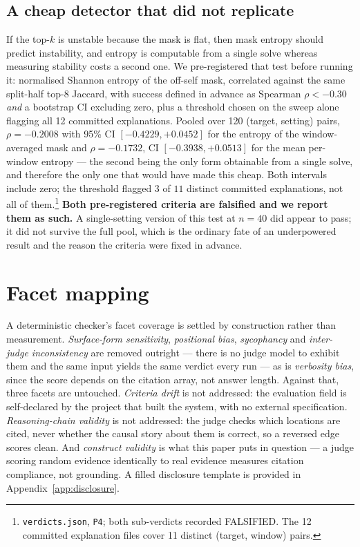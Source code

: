 \documentclass{article}
\begin{document}
\subsection{A cheap detector that did not replicate}

If the top-$k$ is unstable because the mask is flat, then mask entropy should
predict instability, and entropy is computable from a single solve whereas measuring
stability costs a second one. We pre-registered that test before running it:
normalised Shannon entropy of the off-self mask, correlated against the same
split-half top-8 Jaccard, with success defined in advance as Spearman
$\rho < -0.30$ \emph{and} a bootstrap CI excluding zero, plus a threshold chosen on
the sweep alone flagging all 12 committed explanations. Pooled over 120
(target, setting) pairs, $\rho = -0.2008$ with 95\% CI $[-0.4229, +0.0452]$ for the
entropy of the window-averaged mask and $\rho = -0.1732$, CI $[-0.3938, +0.0513]$
for the mean per-window entropy --- the second being the only form obtainable from a
single solve, and therefore the only one that would have made this cheap. Both
intervals include zero; the threshold flagged $3$ of $11$ distinct committed
explanations, not all of
them.\footnote{\texttt{verdicts.json}, \texttt{P4}; both sub-verdicts recorded
FALSIFIED. The 12 committed explanation files cover 11 distinct (target, window)
pairs.} \textbf{Both pre-registered criteria are falsified and we report them as
such.} A single-setting version of this test at $n{=}40$ did appear to pass; it did
not survive the full pool, which is the ordinary fate of an underpowered result and
the reason the criteria were fixed in advance.

\section{Facet mapping}

A deterministic checker's facet coverage is settled by construction rather than
measurement. \emph{Surface-form sensitivity}, \emph{positional bias},
\emph{sycophancy} and \emph{inter-judge inconsistency} are removed outright --- there
is no judge model to exhibit them and the same input yields the same verdict every
run --- as is \emph{verbosity bias}, since the score depends on the citation array,
not answer length. Against that, three facets are untouched. \emph{Criteria drift} is not addressed: the
evaluation field is self-declared by the project that built the system, with no
external specification. \emph{Reasoning-chain validity} is not addressed: the judge
checks which locations are cited, never whether the causal story about them is
correct, so a reversed edge scores clean. And \emph{construct validity} is what this
paper puts in question --- a judge scoring random evidence identically to real
evidence measures citation compliance, not grounding.
A filled disclosure template is provided in Appendix~\ref{app:disclosure}.
\end{document}
